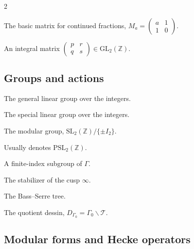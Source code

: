 \documentclass[10pt, a4paper]{article}
\theoremstyle{definition}
\theoremstyle{remark}
\begin{document}
\begin{multicols}{2}
\begin{description}[leftmargin=2.8cm, labelwidth=2.5cm, style=nextline]
\item[\(M_a\)]
The basic matrix for continued fractions,
\(M_a=\begin{pmatrix}a&1\\1&0\end{pmatrix}\).

\item[\(A\)]
An integral matrix
\(\begin{pmatrix}p&r\\q&s\end{pmatrix}\in\mathrm{GL}_2(\mathbb Z)\).

\end{description}

\subsection*{Groups and actions}
\begin{description}[leftmargin=2.8cm, labelwidth=2.5cm, style=nextline]

\item[\(\mathrm{GL}_2(\mathbb Z)\)]
The general linear group over the integers.

\item[\(\mathrm{SL}_2(\mathbb Z)\)]
The special linear group over the integers.

\item[\(\mathrm{PSL}_2(\mathbb Z)\)]
The modular group,
\(\mathrm{SL}_2(\mathbb Z)/\{\pm I_2\}\).

\item[\(\Gamma\)]
Usually denotes \(\mathrm{PSL}_2(\mathbb Z)\).

\item[\(\Gamma_0\)]
A finite-index subgroup of \(\Gamma\).

\item[\(\Gamma_\infty\)]
The stabilizer of the cusp \(\infty\).

\item[\(\mathcal T\)]
The Bass--Serre tree.

\item[\(D_{\Gamma_0}\)]
The quotient dessin, \(D_{\Gamma_0}=\Gamma_0\backslash\mathcal T\).

\end{description}

\subsection*{Modular forms and Hecke operators}
\begin{description}[leftmargin=2.8cm, labelwidth=2.5cm, style=nextline]


\end{description}
\end{multicols}
\end{document}
